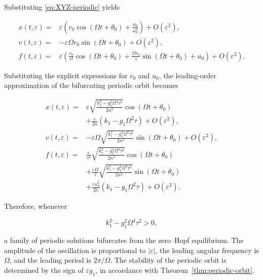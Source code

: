 \documentclass[11pt,reqno]{amsart}
\theoremstyle{plain}
\theoremstyle{definition}
\theoremstyle{remark}
\begin{document}
Substituting \eqref{eq:XYZ-periodic} yields

\begin{equation}
\label{eq:original-periodic-orbit}
\boxed{
\begin{aligned}
x(t,\varepsilon)
={}&
\varepsilon
\left(
r_0\cos(\Omega t+\theta_0)
+
\frac{u_0}{\omega_0^2}
\right)
+
O(\varepsilon^2),
\\[2mm]
v(t,\varepsilon)
={}&
-\varepsilon\Omega r_0
\sin(\Omega t+\theta_0)
+
O(\varepsilon^2),
\\[2mm]
f(t,\varepsilon)
={}&
\varepsilon
\left(
\frac{r_0}{\tau^2}
\cos(\Omega t+\theta_0)
+
\frac{\Omega r_0}{\tau}
\sin(\Omega t+\theta_0)
+
u_0
\right)
+
O(\varepsilon^2).
\end{aligned}}
\end{equation}

Substituting the explicit expressions for $r_0$ and $u_0$, the
leading-order approximation of the bifurcating periodic orbit becomes

\begin{equation}
\label{eq:explicit-periodic-orbit}
\boxed{
\begin{aligned}
x(t,\varepsilon)
={}&
\varepsilon
\sqrt{
\frac{
k_1^2-g_1^2\Omega^4\tau^2
}
{2\kappa^2}
}
\cos(\Omega t+\theta_0)
\\
&
+
\frac{\varepsilon}{2\kappa}
\left(
k_1-g_1\Omega^2\tau
\right)
+
O(\varepsilon^2),
\\[3mm]
v(t,\varepsilon)
={}&
-\varepsilon\Omega
\sqrt{
\frac{
k_1^2-g_1^2\Omega^4\tau^2
}
{2\kappa^2}
}
\sin(\Omega t+\theta_0)
+
O(\varepsilon^2),
\\[3mm]
f(t,\varepsilon)
={}&
\frac{\varepsilon}{\tau^2}
\sqrt{
\frac{
k_1^2-g_1^2\Omega^4\tau^2
}
{2\kappa^2}
}
\cos(\Omega t+\theta_0)
\\
&
+
\frac{\varepsilon\Omega}{\tau}
\sqrt{
\frac{
k_1^2-g_1^2\Omega^4\tau^2
}
{2\kappa^2}
}
\sin(\Omega t+\theta_0)
\\
&
+
\frac{\varepsilon\omega_0^2}{2\kappa}
\left(
k_1-g_1\Omega^2\tau
\right)
+
O(\varepsilon^2).
\end{aligned}}
\end{equation}

Therefore, whenever

\[
k_1^2-g_1^2\Omega^4\tau^2>0,
\]

a family of periodic solutions bifurcates from the zero--Hopf
equilibrium. The amplitude of the oscillation is proportional to
$|\varepsilon|$, the leading angular frequency is $\Omega$, and the
leading period is $2\pi/\Omega$. The stability of the periodic orbit is
determined by the sign of $\varepsilon g_1$, in accordance with
Theorem~\ref{thm:periodic-orbit}.







\end{document}
